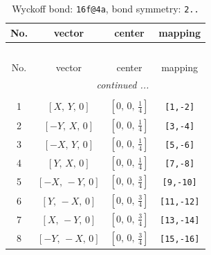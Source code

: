 \documentclass[fleqn,8pt]{jsarticle}
\begin{document}
\begin{longtable}{cccc}
\caption{Wyckoff bond: {\tt 16f@4a}, bond symmetry: {\tt 2..}}
 \\
 \hline \hline
No. & vector & center & mapping \\ \hline \endfirsthead

\multicolumn{3}{l}{\tablename\ \thetable{}} \\
 \hline \hline
No. & vector & center & mapping \\ \hline \endhead

 \hline \hline
\multicolumn{3}{r}{\footnotesize\it continued ...} \\ \endfoot

 \hline \hline
\multicolumn{3}{r}{} \\ \endlastfoot

1 & $\left[ X,\, Y,\, 0 \right]$ & $\left[ 0,\, 0,\, \frac{1}{4} \right]$ & {\tt [1,-2]} \\ \hline
2 & $\left[ - Y,\, X,\, 0 \right]$ & $\left[ 0,\, 0,\, \frac{1}{4} \right]$ & {\tt [3,-4]} \\ \hline
3 & $\left[ - X,\, Y,\, 0 \right]$ & $\left[ 0,\, 0,\, \frac{1}{4} \right]$ & {\tt [5,-6]} \\ \hline
4 & $\left[ Y,\, X,\, 0 \right]$ & $\left[ 0,\, 0,\, \frac{1}{4} \right]$ & {\tt [7,-8]} \\ \hline
5 & $\left[ - X,\, - Y,\, 0 \right]$ & $\left[ 0,\, 0,\, \frac{3}{4} \right]$ & {\tt [9,-10]} \\ \hline
6 & $\left[ Y,\, - X,\, 0 \right]$ & $\left[ 0,\, 0,\, \frac{3}{4} \right]$ & {\tt [11,-12]} \\ \hline
7 & $\left[ X,\, - Y,\, 0 \right]$ & $\left[ 0,\, 0,\, \frac{3}{4} \right]$ & {\tt [13,-14]} \\ \hline
8 & $\left[ - Y,\, - X,\, 0 \right]$ & $\left[ 0,\, 0,\, \frac{3}{4} \right]$ & {\tt [15,-16]} \\
\end{longtable}
\renewcommand{\arraystretch}{1.2}
\end{document}
